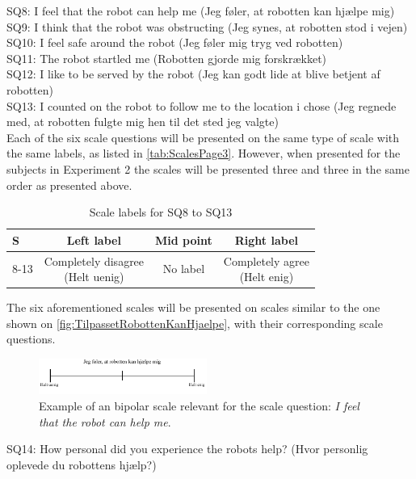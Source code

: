 SQ8: I feel that the robot can help me (Jeg føler, at robotten kan hjælpe mig)\\
SQ9: I think that the robot was obstructing (Jeg synes, at robotten stod i vejen)\\
SQ10: I feel safe around the robot (Jeg føler mig tryg ved robotten)\\
SQ11: The robot startled me (Robotten gjorde mig forskrækket)\\
SQ12: I like to be served by the robot (Jeg kan godt lide at blive betjent af robotten)\\
SQ13: I counted on the robot to follow me to the location i chose (Jeg regnede med, at robotten fulgte mig hen til det sted jeg valgte)\\
Each of the six scale questions will be presented on the same type of scale with the same labels, as listed in \autoref{tab:ScalesPage3}. However, when presented for the subjects in Experiment 2 the scales will be presented three and three in the same order as presented above.   
%
\begin{table}[H]
	\centering
\caption{Scale labels for SQ8 to SQ13}
	\label{tab:ScalesPage3} 
	\begin{tabular}{l|c|c|c}
		S     & Left label & Mid point & Right label \\\hline
		8-13   & \makecell{Completely disagree\\(Helt uenig)}  & No label & \makecell{Completely agree\\(Helt enig)}                      
	\end{tabular}        
\end{table}
\noindent
%
The six aforementioned scales will be presented on scales similar to the one shown on \autoref{fig:TilpassetRobottenKanHjaelpe}, with their corresponding scale questions. 
%
\begin{figure}[H]
\centering
\includegraphics[width = 0.49\textwidth]{Figure/TilpassetRobottenKanHjaelpe}
\setlength{} 
\caption{Example of an bipolar scale relevant for the scale question: \textit{I feel that the robot can help me}.}
\label{fig:TilpassetRobottenKanHjaelpe}
\end{figure}
\noindent
% 
SQ14: How personal did you experience the robots help? (Hvor personlig oplevede du robottens hjælp?)\\
